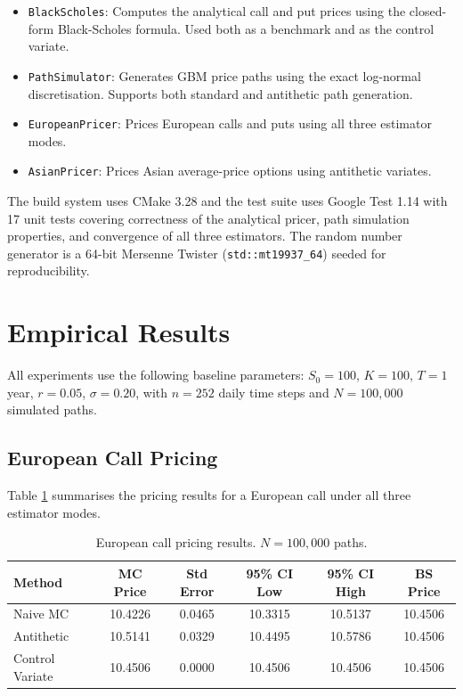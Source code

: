 \documentclass[12pt]{article}
\begin{document}
\begin{itemize}
    \item \texttt{BlackScholes}: Computes the analytical call and put prices
    using the closed-form Black-Scholes formula. Used both as a benchmark
    and as the control variate.
    \item \texttt{PathSimulator}: Generates GBM price paths using the exact
    log-normal discretisation. Supports both standard and antithetic path
    generation.
    \item \texttt{EuropeanPricer}: Prices European calls and puts using all
    three estimator modes.
    \item \texttt{AsianPricer}: Prices Asian average-price options using
    antithetic variates.
\end{itemize}

The build system uses CMake 3.28 and the test suite uses Google Test 1.14
with 17 unit tests covering correctness of the analytical pricer,
path simulation properties, and convergence of all three estimators.
The random number generator is a 64-bit Mersenne Twister
(\texttt{std::mt19937\_64}) seeded for reproducibility.

\section{Empirical Results}

All experiments use the following baseline parameters: $S_0 = 100$,
$K = 100$, $T = 1$ year, $r = 0.05$, $\sigma = 0.20$, with $n = 252$
daily time steps and $N = 100{,}000$ simulated paths.

\subsection{European Call Pricing}

Table \ref{tab:results} summarises the pricing results for a European call
under all three estimator modes.

\begin{table}[H]
\centering
\begin{tabular}{lccccc}
\toprule
Method & MC Price & Std Error & 95\% CI Low & 95\% CI High & BS Price \\
\midrule
Naive MC          & 10.4226 & 0.0465 & 10.3315 & 10.5137 & 10.4506 \\
Antithetic        & 10.5141 & 0.0329 & 10.4495 & 10.5786 & 10.4506 \\
Control Variate   & 10.4506 & 0.0000 & 10.4506 & 10.4506 & 10.4506 \\
\bottomrule
\end{tabular}
\caption{European call pricing results. $N = 100{,}000$ paths.}
\label{tab:results}
\end{table}
\end{document}

